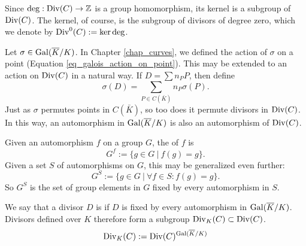 Since $\deg : \operatorname{Div}(C) \to \mathbb{Z}$ is a group homomorphism, its kernel is a subgroup of $\operatorname{Div}(C)$.
The kernel, of course, is the subgroup of divisors of degree zero, which we denote by $\operatorname{Div}^0(C) := \ker \deg$.

Let $\sigma \in \operatorname{Gal}(\overline K / K)$.
In Chapter \ref{chap_curves}, we defined the action of $\sigma$ on a point (Equation \ref{eq_galois_action_on_point}).
This may be extended to an action on $\operatorname{Div}(C)$ in a natural way.
If $D = \sum n_P P$, then define
\[ \sigma(D) = \sum_{P \in C(\bar K)} n_P \sigma(P). \]
Just as $\sigma$ permutes points in $C(\bar K)$, so too does it permute divisors in $\operatorname{Div}(C)$.
In this way, an automorphism in $\operatorname{Gal}(\overline K/K)$ is also an automorphism of $\operatorname{Div}(C)$.

Given an automorphism $f$ on a group $G$, the  of $f$ is
  \[ G^f := \{ g \in G ~|~ f(g) = g \}. \]
Given a set $S$ of automorphisms on $G$, this may be generalized even further:
  \[ G^S := \{ g \in G ~|~ \forall f \in S : f(g) = g \}. \]
So $G^S$ is the set of group elements in $G$ fixed by every automorphism in $S$.

We say that a divisor $D$ is  if $D$ is fixed by every automorphism in $\operatorname{Gal}(\overline K/K)$.
Divisors defined over $K$ therefore form a subgroup $\operatorname{Div}_K(C) \subset \operatorname{Div}(C)$.
  \[ \operatorname{Div}_K(C) := \operatorname{Div}(C)^{\operatorname{Gal}(\overline K/K)} \]

